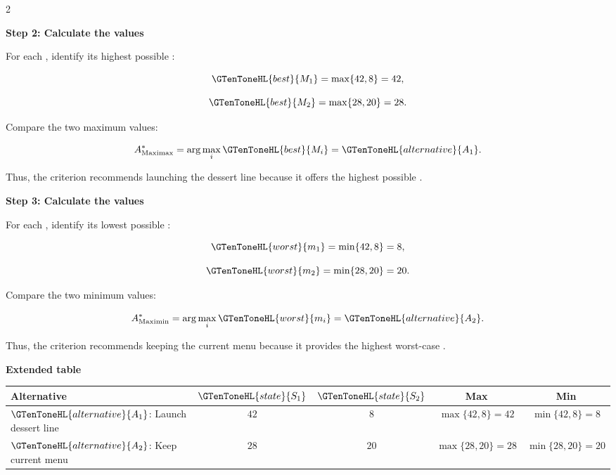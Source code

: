 	\begin{multicols}{2}
		\vspace{0pt}
		
		\textbf{Step 2: Calculate the  values}
		
		For each , identify its highest possible :
		
		\[
		\GTenToneHL{best}{M_1}
		=
		\max\{42,8\}
		=
		42,
		\]
		
		\[
		\GTenToneHL{best}{M_2}
		=
		\max\{28,20\}
		=
		28.
		\]
		
		Compare the two maximum values:
		
		\[
		A^*_{\mathrm{Maximax}}
		=
		\arg\max_i \GTenToneHL{best}{M_i}
		=
		\GTenToneHL{alternative}{A_1}.
		\]
		
		Thus, the  criterion recommends launching the dessert line because it offers the highest possible .
		
		\columnbreak
		
		\textbf{Step 3: Calculate the  values}
		
		For each , identify its lowest possible :
		
		\[
		\GTenToneHL{worst}{m_1}
		=
		\min\{42,8\}
		=
		8,
		\]
		
		\[
		\GTenToneHL{worst}{m_2}
		=
		\min\{28,20\}
		=
		20.
		\]
		
		Compare the two minimum values:
		
		\[
		A^*_{\mathrm{Maximin}}
		=
		\arg\max_i \GTenToneHL{worst}{m_i}
		=
		\GTenToneHL{alternative}{A_2}.
		\]
		
		Thus, the  criterion recommends keeping the current menu because it provides the highest worst-case .
		
	\end{multicols}
	
	\setlength{\columnseprule}{0pt}
	
	\textbf{Extended  table}
	
	\begin{center}
		\small
		\renewcommand{\arraystretch}{1.5}
		\setlength{\tabcolsep}{4pt}
		
		\begin{tabular}{lcccc}
			\toprule
			Alternative & $\GTenToneHL{state}{S_1}$ & $\GTenToneHL{state}{S_2}$ & Max & Min \\
			\midrule
			
			$\GTenToneHL{alternative}{A_1}$: Launch dessert line
			& $42$
			& $8$
			& $\max\{42,8\}=42$
			& $\min\{42,8\}=8$
			\\
			
			$\GTenToneHL{alternative}{A_2}$: Keep current menu
			& $28$
			& $20$
			& $\max\{28,20\}=28$
			& $\min\{28,20\}=20$
			\\
			
			\bottomrule
		\end{tabular}
		\end{center}
	
